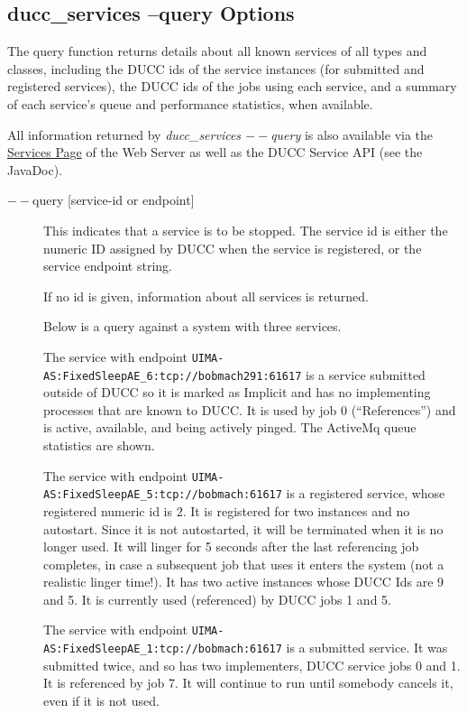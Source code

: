    \subsection{ducc\_services --query Options}
    The query function returns details about all known services of all types and classes, including 
    the DUCC ids of the service instances (for submitted and registered services), the DUCC ids of 
    the jobs using each service, and a summary of each service's queue and performance statistics, 
    when available. 
    
    All information returned by {\em ducc\_services $--$query} is also available via the
    \hyperref[ws:services-page]{Services Page} of the Web Server as well as the DUCC Service API (see 
    the JavaDoc).

    \begin{description}
    \item[$--$query {[service-id or endpoint]}] This indicates that a service is to be stopped. The
      service id is either the numeric ID assigned by DUCC when the service is registered, or the
      service endpoint string.

      If no id is given, information about all services is returned. 

      Below is a query against a system with three services. 

      The service with endpoint {\tt UIMA-AS:FixedSleepAE\_6:tcp://bobmach291:61617} is a service
      submitted outside of DUCC so it is marked as Implicit and has no implementing processes that
      are known to DUCC. It is used by job 0 (``References'') and is active, available, and being
      actively pinged. The ActiveMq queue statistics are shown.

      The service with endpoint {\tt UIMA-AS:FixedSleepAE\_5:tcp://bobmach:61617} is a 
      registered service, whose registered numeric id is 2. It is registered for two instances and 
      no autostart. Since it is not autostarted, it will be terminated when it is no longer used. It 
      will linger for 5 seconds after the last referencing job completes, in case a subsequent job 
      that uses it enters the system (not a realistic linger time!). It has two active
      instances whose DUCC Ids are 9 and 5. It is currently used (referenced) 
      by DUCC jobs 1 and 5. 

      The service with endpoint {\tt UIMA-AS:FixedSleepAE\_1:tcp://bobmach:61617} is a 
      submitted service. It was submitted twice, and so has two implementers, DUCC service 
      jobs 0 and 1. It is referenced by job 7. It will continue to run until somebody cancels it, 
      even if it is not used. 


\end{description}
